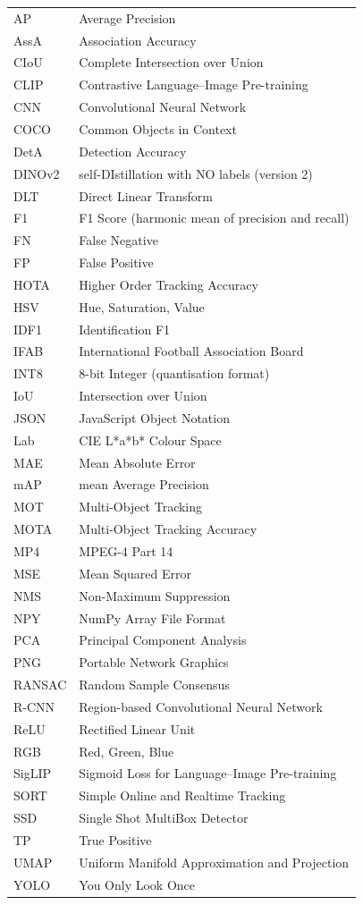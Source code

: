\begin{longtable}{@{}p{2.5cm}p{12cm}@{}}
AP     & Average Precision \\
AssA   & Association Accuracy \\
CIoU   & Complete Intersection over Union \\
CLIP   & Contrastive Language--Image Pre-training \\
CNN    & Convolutional Neural Network \\
COCO   & Common Objects in Context \\
DetA   & Detection Accuracy \\
DINOv2 & self-DIstillation with NO labels (version 2) \\
DLT    & Direct Linear Transform \\
F1     & F1 Score (harmonic mean of precision and recall) \\
FN     & False Negative \\
FP     & False Positive \\
HOTA   & Higher Order Tracking Accuracy \\
HSV    & Hue, Saturation, Value \\
IDF1   & Identification F1 \\
IFAB   & International Football Association Board \\
INT8   & 8-bit Integer (quantisation format) \\
IoU    & Intersection over Union \\
JSON   & JavaScript Object Notation \\
Lab    & CIE L*a*b* Colour Space \\
MAE    & Mean Absolute Error \\
mAP    & mean Average Precision \\
MOT    & Multi-Object Tracking \\
MOTA   & Multi-Object Tracking Accuracy \\
MP4    & MPEG-4 Part 14 \\
MSE    & Mean Squared Error \\
NMS    & Non-Maximum Suppression \\
NPY    & NumPy Array File Format \\
PCA    & Principal Component Analysis \\
PNG    & Portable Network Graphics \\
RANSAC & Random Sample Consensus \\
R-CNN  & Region-based Convolutional Neural Network \\
ReLU   & Rectified Linear Unit \\
RGB    & Red, Green, Blue \\
SigLIP & Sigmoid Loss for Language--Image Pre-training \\
SORT   & Simple Online and Realtime Tracking \\
SSD    & Single Shot MultiBox Detector \\
TP     & True Positive \\
UMAP   & Uniform Manifold Approximation and Projection \\
YOLO   & You Only Look Once \\
\end{longtable}
